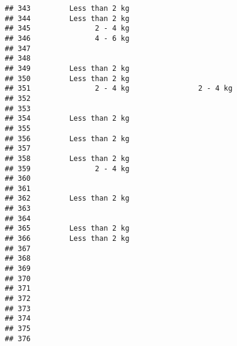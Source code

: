 \documentclass[
]{article}
\begin{document}
\begin{verbatim}
## 343         Less than 2 kg                                               
## 344         Less than 2 kg                                               
## 345               2 - 4 kg                                               
## 346               4 - 6 kg                                               
## 347                                                                      
## 348                                                                      
## 349         Less than 2 kg                                               
## 350         Less than 2 kg                                               
## 351               2 - 4 kg                2 - 4 kg                       
## 352                                                                      
## 353                                                                      
## 354         Less than 2 kg                                               
## 355                                                                      
## 356         Less than 2 kg                                               
## 357                                                                      
## 358         Less than 2 kg                                               
## 359               2 - 4 kg                                               
## 360                                                                      
## 361                                                                      
## 362         Less than 2 kg                                               
## 363                                                                      
## 364                                                                      
## 365         Less than 2 kg                                               
## 366         Less than 2 kg                                               
## 367                                                                      
## 368                                                                      
## 369                                                                      
## 370                                                                      
## 371                                                                      
## 372                                                                      
## 373                                                                      
## 374                                                                      
## 375                                                                      
## 376                                                                      

\end{verbatim}
\end{document}
